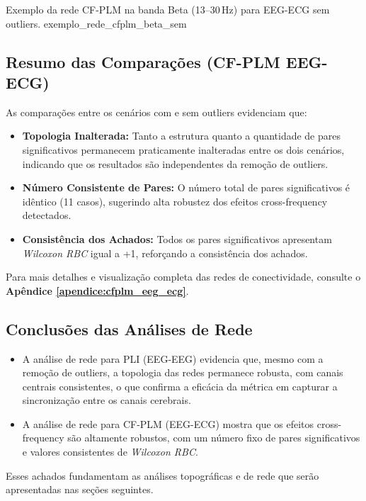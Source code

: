 {Exemplo da rede CF-PLM na banda Beta (13--30\,Hz) para EEG-ECG sem outliers.}
{exemplo_rede_cfplm_beta_sem}

\subsection{Resumo das Comparações (CF-PLM EEG-ECG)}

As comparações entre os cenários com e sem outliers evidenciam que:
\begin{itemize}
    \item \textbf{Topologia Inalterada:} Tanto a estrutura quanto a quantidade de pares significativos permanecem praticamente inalteradas entre os dois cenários, indicando que os resultados são independentes da remoção de outliers.
    \item \textbf{Número Consistente de Pares:} O número total de pares significativos é idêntico (11 casos), sugerindo alta robustez dos efeitos cross-frequency detectados.
    \item \textbf{Consistência dos Achados:} Todos os pares significativos apresentam \emph{Wilcoxon RBC} igual a +1, reforçando a consistência dos achados.
\end{itemize}

Para mais detalhes e visualização completa das redes de conectividade, consulte o \textbf{Apêndice \ref{apendice:cfplm_eeg_ecg}}.

\subsection{Conclusões das Análises de Rede}
\begin{itemize}
    \item A análise de rede para PLI (EEG-EEG) evidencia que, mesmo com a remoção de outliers, a topologia das redes permanece robusta, com canais centrais consistentes, o que confirma a eficácia da métrica em capturar a sincronização entre os canais cerebrais.
    \item A análise de rede para CF-PLM (EEG-ECG) mostra que os efeitos cross-frequency são altamente robustos, com um número fixo de pares significativos e valores consistentes de \emph{Wilcoxon RBC}.
\end{itemize}

Esses achados fundamentam as análises topográficas e de rede que serão apresentadas nas seções seguintes.